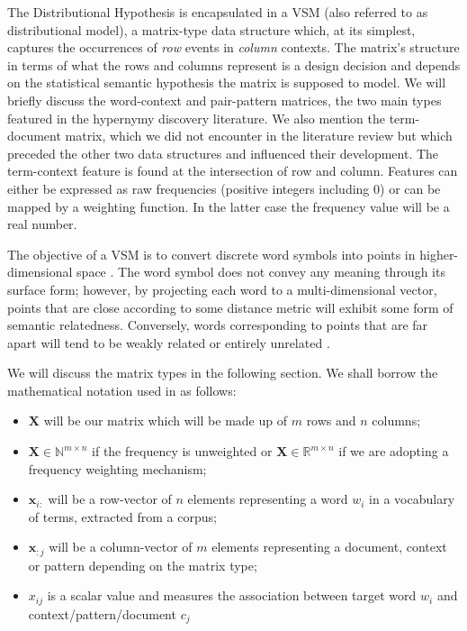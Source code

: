 The Distributional Hypothesis is encapsulated in a \ac{VSM} (also referred to as distributional model), a matrix-type data structure which, at its simplest, captures the occurrences of \textit{row} events in \textit{column} contexts. The matrix’s structure in terms of what the rows and columns represent is a design decision and depends on the statistical semantic hypothesis the matrix is supposed to model.  We will briefly discuss the word-context and pair-pattern matrices, the two main types featured in the hypernymy discovery literature.  We also mention the term-document matrix, which we did not encounter in the literature review but which preceded the other two data structures and influenced their development.  The term-context feature is found at the intersection of row and column.  Features can either be expressed as raw frequencies (positive integers including 0) or can be mapped by a weighting function.  In the latter case the frequency value will be a real number.

The objective of a \ac{VSM} is to convert discrete word symbols into points in higher-dimensional space \citep{turney2010frequency}.  The word symbol does not convey any meaning through its surface form; however, by projecting each word to a multi-dimensional vector, points that are close according to some distance metric will exhibit some form of semantic relatedness.  Conversely, words corresponding to points that are far apart will tend to be weakly related or entirely unrelated \citep{turney2010frequency}.

We will discuss the matrix types in the following section.  We shall borrow the mathematical notation used in \citep{turney2010frequency} as follows:
\begin{itemize}
    \item $\textbf{X}$ will be our matrix which will be made up of $m$ rows and $n$ columns;
    \item $\textbf{X} \in \mathbb{N}^{m \times n}$ if the frequency is unweighted or $\textbf{X} \in \mathbb{R}^{m \times n}$ if we are adopting a frequency weighting mechanism;
    \item $\textbf{x}_{i:}$ will be a row-vector of $n$ elements representing a word $w_i$ in a vocabulary of terms, extracted from a corpus;
    \item $\textbf{x}_{:j}$ will be a column-vector of $m$ elements representing a document, context or pattern depending on the matrix type;
    \item $x_{ij}$ is a scalar value and measures the association between target word $w_i$ and context/pattern/document $c_j$
\end{itemize}    

